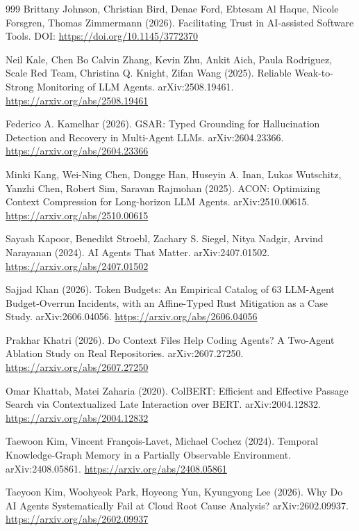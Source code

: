\begin{thebibliography}{999}
 Brittany Johnson, Christian Bird, Denae Ford, Ebtesam Al Haque, Nicole Forsgren, Thomas Zimmermann (2026). Facilitating Trust in AI-assisted Software Tools. DOI: \url{https://doi.org/10.1145/3772370}

 Neil Kale, Chen Bo Calvin Zhang, Kevin Zhu, Ankit Aich, Paula Rodriguez, Scale Red Team, Christina Q. Knight, Zifan Wang (2025). Reliable Weak-to-Strong Monitoring of LLM Agents. arXiv:2508.19461. \url{https://arxiv.org/abs/2508.19461}

 Federico A. Kamelhar (2026). GSAR: Typed Grounding for Hallucination Detection and Recovery in Multi-Agent LLMs. arXiv:2604.23366. \url{https://arxiv.org/abs/2604.23366}

 Minki Kang, Wei-Ning Chen, Dongge Han, Huseyin A. Inan, Lukas Wutschitz, Yanzhi Chen, Robert Sim, Saravan Rajmohan (2025). ACON: Optimizing Context Compression for Long-horizon LLM Agents. arXiv:2510.00615. \url{https://arxiv.org/abs/2510.00615}

 Sayash Kapoor, Benedikt Stroebl, Zachary S. Siegel, Nitya Nadgir, Arvind Narayanan (2024). AI Agents That Matter. arXiv:2407.01502. \url{https://arxiv.org/abs/2407.01502}

 Sajjad Khan (2026). Token Budgets: An Empirical Catalog of 63 LLM-Agent Budget-Overrun Incidents, with an Affine-Typed Rust Mitigation as a Case Study. arXiv:2606.04056. \url{https://arxiv.org/abs/2606.04056}

 Prakhar Khatri (2026). Do Context Files Help Coding Agents? A Two-Agent Ablation Study on Real Repositories. arXiv:2607.27250. \url{https://arxiv.org/abs/2607.27250}

 Omar Khattab, Matei Zaharia (2020). ColBERT: Efficient and Effective Passage Search via Contextualized Late Interaction over BERT. arXiv:2004.12832. \url{https://arxiv.org/abs/2004.12832}

 Taewoon Kim, Vincent Fran\c{c}ois-Lavet, Michael Cochez (2024). Temporal Knowledge-Graph Memory in a Partially Observable Environment. arXiv:2408.05861. \url{https://arxiv.org/abs/2408.05861}

 Taeyoon Kim, Woohyeok Park, Hoyeong Yun, Kyungyong Lee (2026). Why Do AI Agents Systematically Fail at Cloud Root Cause Analysis? arXiv:2602.09937. \url{https://arxiv.org/abs/2602.09937}


\end{thebibliography}
